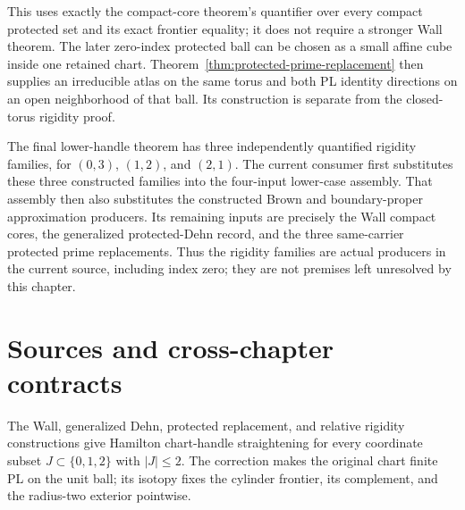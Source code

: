 This uses exactly the compact-core theorem's quantifier over every compact
protected set and its exact frontier equality; it does not require a
stronger Wall theorem. The later zero-index protected ball can be
chosen as a small affine cube inside one retained chart.
Theorem~\ref{thm:protected-prime-replacement} then supplies an irreducible
atlas on the same torus and both PL identity directions on an open
neighborhood of that ball. Its construction is separate from the
closed-torus rigidity proof.

The final lower-handle theorem has three independently quantified rigidity
families, for $(0,3)$, $(1,2)$, and $(2,1)$.  The current consumer first
substitutes these three constructed families into the four-input lower-case
assembly.  That assembly then also substitutes the constructed Brown and
boundary-proper approximation producers.  Its remaining inputs are precisely
the Wall compact cores, the generalized protected-Dehn record, and the three
same-carrier protected prime replacements.  Thus the rigidity families are
actual producers in the current source, including index zero; they are not
premises left unresolved by this chapter.

\section{Sources and cross-chapter contracts}

\begin{theorem}
\label{thm:lower-handle-straightening}
The Wall, generalized Dehn, protected replacement, and relative rigidity
constructions give Hamilton chart-handle straightening for every coordinate
subset $J\subset\{0,1,2\}$ with $|J|\leq2$. The correction makes the
original chart finite PL on the unit ball; its isotopy fixes the cylinder
frontier, its complement, and the radius-two exterior pointwise.
\end{theorem}
\label{sec:relative-rigidity-sources}
\label{sec:relative-contracts-limitations}

